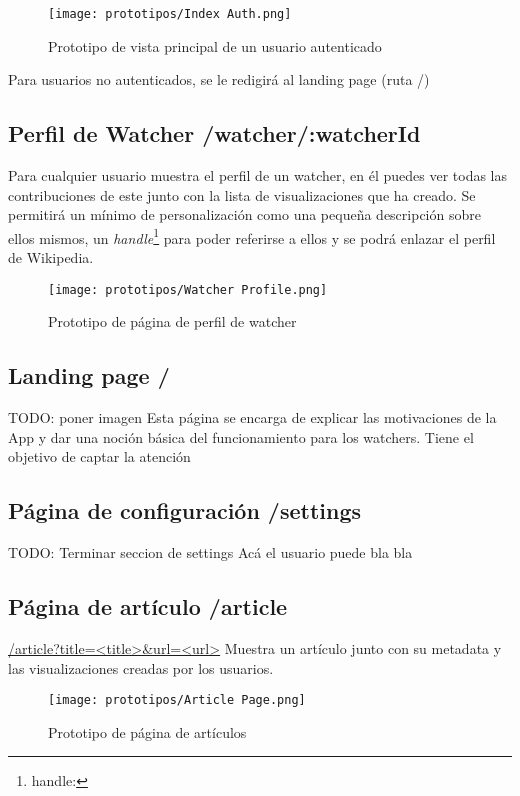 \begin{figure}[H]
    \centering
    \texttt{[image: prototipos/Index Auth.png]}
    \caption{Prototipo de vista principal de un usuario autenticado}
    \label{PrototipoHomePage}
\end{figure}

Para usuarios no autenticados, se le redigirá al landing page (ruta /)

\subsection{Perfil de Watcher /watcher/:watcherId}
Para cualquier usuario muestra el perfil de un watcher, en él puedes ver todas las contribuciones de este junto con la lista de visualizaciones que ha creado.
Se permitirá un mínimo de personalización como una pequeña descripción sobre ellos mismos, un \textit{handle}\footnote{handle: } para poder referirse a ellos y se podrá enlazar el perfil de Wikipedia.

\begin{figure}[H]
    \centering
    \texttt{[image: prototipos/Watcher Profile.png]}
    \caption{Prototipo de página de perfil de watcher}
    \label{PrototipoWatchersProfile}
\end{figure}

\subsection{Landing page /}
TODO: poner imagen
Esta página se encarga de explicar las motivaciones de la App y dar una noción básica del funcionamiento para los watchers.
Tiene el objetivo de captar la atención 


\subsection{Página de configuración /settings}
TODO: Terminar seccion de settings
Acá el usuario puede bla bla

\subsection{Página de artículo /article}
\url{/article?title=<title>&url=<url>}
Muestra un artículo junto con su metadata y las visualizaciones creadas por los usuarios.

\begin{figure}[H]
    \centering
    \texttt{[image: prototipos/Article Page.png]}
    \caption{Prototipo de página de artículos}
    \label{PrototipoSettingsPage}
\end{figure}

